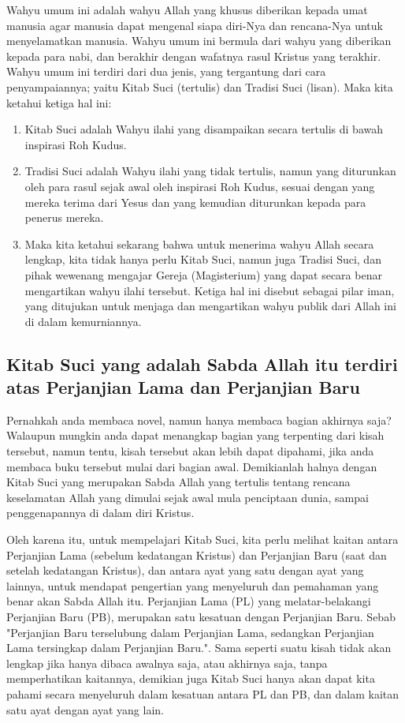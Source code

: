 Wahyu umum ini adalah wahyu Allah yang khusus diberikan kepada umat manusia agar manusia dapat mengenal siapa diri-Nya dan rencana-Nya untuk menyelamatkan manusia. Wahyu umum ini bermula dari wahyu yang diberikan kepada para nabi, dan berakhir dengan wafatnya rasul Kristus yang terakhir. Wahyu umum ini terdiri dari dua jenis, yang tergantung dari cara penyampaiannya; yaitu Kitab Suci (tertulis) dan Tradisi Suci (lisan). Maka kita ketahui ketiga hal ini:
\begin{enumerate}
\item Kitab Suci adalah Wahyu ilahi yang disampaikan secara tertulis di bawah inspirasi Roh Kudus.
\item Tradisi Suci adalah Wahyu ilahi yang tidak tertulis, namun yang diturunkan oleh para rasul sejak awal oleh inspirasi Roh Kudus, sesuai dengan yang mereka terima dari Yesus dan yang kemudian diturunkan kepada para penerus mereka.
\item Maka kita ketahui sekarang bahwa untuk menerima wahyu Allah secara lengkap, kita tidak hanya perlu Kitab Suci, namun juga Tradisi Suci, dan pihak wewenang mengajar Gereja (Magisterium) yang dapat secara benar mengartikan wahyu ilahi tersebut. Ketiga hal ini disebut sebagai pilar iman, yang ditujukan untuk menjaga dan mengartikan wahyu publik dari Allah ini di dalam kemurniannya.
\end{enumerate}

\subsection{Kitab Suci yang adalah Sabda Allah itu terdiri atas Perjanjian Lama dan Perjanjian Baru}
Pernahkah anda membaca novel, namun hanya membaca bagian akhirnya saja? Walaupun mungkin anda dapat menangkap bagian yang terpenting dari kisah tersebut, namun tentu, kisah tersebut akan lebih dapat dipahami, jika anda membaca buku tersebut mulai dari bagian awal. Demikianlah halnya dengan Kitab Suci yang merupakan Sabda Allah yang tertulis tentang rencana keselamatan Allah yang dimulai sejak awal mula penciptaan dunia, sampai penggenapannya di dalam diri Kristus.

Oleh karena itu, untuk mempelajari Kitab Suci, kita perlu melihat kaitan antara Perjanjian Lama (sebelum kedatangan Kristus) dan Perjanjian Baru (saat dan setelah kedatangan Kristus), dan antara ayat yang satu dengan ayat yang lainnya, untuk mendapat pengertian yang menyeluruh dan pemahaman yang benar akan Sabda Allah itu. Perjanjian Lama (PL) yang melatar-belakangi Perjanjian Baru (PB), merupakan satu kesatuan dengan Perjanjian Baru. Sebab "Perjanjian Baru terselubung dalam Perjanjian Lama, sedangkan Perjanjian Lama tersingkap dalam Perjanjian Baru.". Sama seperti suatu kisah tidak akan lengkap jika hanya dibaca awalnya saja, atau akhirnya saja, tanpa memperhatikan kaitannya, demikian juga Kitab Suci hanya akan dapat kita pahami secara menyeluruh dalam kesatuan antara PL dan PB, dan dalam kaitan satu ayat dengan ayat yang lain.

